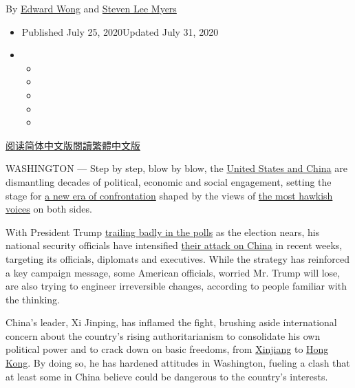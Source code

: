 By \href{https://www.nytimes3xbfgragh.onion/by/edward-wong}{Edward Wong}
and \href{https://www.nytimes3xbfgragh.onion/by/steven-lee-myers}{Steven
Lee Myers}

\begin{itemize}
\item
  Published July 25, 2020Updated July 31, 2020
\item
  \begin{itemize}
  \item
  \item
  \item
  \item
  \item
  \end{itemize}
\end{itemize}

\href{https://cn.nytimes3xbfgragh.onion/china/20200727/us-china-trump-xi/}{阅读简体中文版}\href{https://cn.nytimes3xbfgragh.onion/china/20200727/us-china-trump-xi/zh-hant/}{閱讀繁體中文版}

WASHINGTON --- Step by step, blow by blow, the
\href{https://www.nytimes3xbfgragh.onion/2020/07/29/podcasts/the-daily/china-trump-foreign-policy.html}{United
States and China} are dismantling decades of political, economic and
social engagement, setting the stage for
\href{https://www.nytimes3xbfgragh.onion/2019/06/26/world/asia/united-states-china-conflict.html}{a
new era of confrontation} shaped by the views of
\href{https://www.nytimes3xbfgragh.onion/2020/07/14/world/asia/cold-war-china-us.html}{the
most hawkish voices} on both sides.

With President Trump
\href{https://www.nytimes3xbfgragh.onion/2020/07/24/upshot/biden-polls-demographics.html}{trailing
badly in the polls} as the election nears, his national security
officials have intensified
\href{https://www.nytimes3xbfgragh.onion/2020/03/22/us/politics/coronavirus-us-china.html}{their
attack on China} in recent weeks, targeting its officials, diplomats and
executives. While the strategy has reinforced a key campaign message,
some American officials, worried Mr. Trump will lose, are also trying to
engineer irreversible changes, according to people familiar with the
thinking.

China's leader, Xi Jinping, has inflamed the fight, brushing aside
international concern about the country's rising authoritarianism to
consolidate his own political power and to crack down on basic freedoms,
from
\href{https://www.nytimes3xbfgragh.onion/interactive/2019/11/16/world/asia/china-xinjiang-documents.html}{Xinjiang}
to
\href{https://www.nytimes3xbfgragh.onion/2020/06/29/world/asia/china-hong-kong-security-law-rules.html}{Hong
Kong}. By doing so, he has hardened attitudes in Washington, fueling a
clash that at least some in China believe could be dangerous to the
country's interests.

